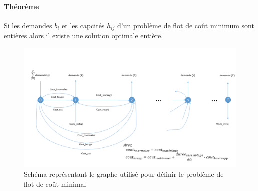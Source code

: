 \documentclass[12pt,oneside,a4paper]{article}
\begin{document}
\paragraph{Théorème}
Si les demandes $b_i$ et les capcités $h_{ij}$ d'un problème de flot de coût minimum sont entières alors il existe une solution optimale entière.
\begin{figure}[hp]
	\centering
		\includegraphics[scale = 0.5]{Schema_flot.png}
	\caption{Schéma représentant le graphe utilisé pour définir le problème de flot de coût minimal}
	\label{fig:schema_flot}
\end{figure}
\end{document}
